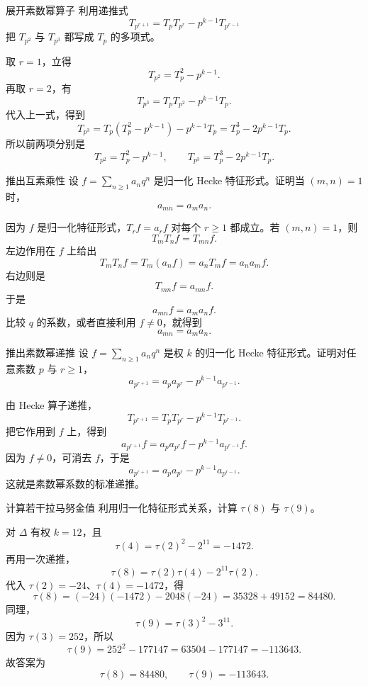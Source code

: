 \begin{problem}{展开素数幂算子}
\medium
利用递推式
\[
T_{p^{r+1}}=T_pT_{p^r}-p^{k-1}T_{p^{r-1}}
\]
把 $T_{p^2}$ 与 $T_{p^3}$ 都写成 $T_p$ 的多项式。
\end{problem}
\begin{solution}
取 $r=1$，立得
\[
T_{p^2}=T_p^2-p^{k-1}.
\]
再取 $r=2$，有
\[
T_{p^3}=T_pT_{p^2}-p^{k-1}T_p.
\]
代入上一式，得到
\[
T_{p^3}=T_p(T_p^2-p^{k-1})-p^{k-1}T_p=T_p^3-2p^{k-1}T_p.
\]
所以前两项分别是
\[
T_{p^2}=T_p^2-p^{k-1},
\qquad
T_{p^3}=T_p^3-2p^{k-1}T_p.
\]
\end{solution}

\begin{problem}{推出互素乘性}
\medium
设 $f=\sum_{n\ge1}a_nq^n$ 是归一化 Hecke 特征形式。证明当 $(m,n)=1$ 时，
\[
a_{mn}=a_ma_n.
\]
\end{problem}
\begin{solution}
因为 $f$ 是归一化特征形式，$T_rf=a_rf$ 对每个 $r\ge1$ 都成立。若 $(m,n)=1$，则
\[
T_mT_nf=T_{mn}f.
\]
左边作用在 $f$ 上给出
\[
T_mT_nf=T_m(a_nf)=a_nT_mf=a_na_mf.
\]
右边则是
\[
T_{mn}f=a_{mn}f.
\]
于是
\[
a_{mn}f=a_ma_nf.
\]
比较 $q$ 的系数，或者直接利用 $f\neq0$，就得到
\[
a_{mn}=a_ma_n.
\]
\end{solution}

\begin{problem}{推出素数幂递推}
\medium
设 $f=\sum_{n\ge1}a_nq^n$ 是权 $k$ 的归一化 Hecke 特征形式。证明对任意素数 $p$ 与 $r\ge1$，
\[
a_{p^{r+1}}=a_pa_{p^r}-p^{k-1}a_{p^{r-1}}.
\]
\end{problem}
\begin{solution}
由 Hecke 算子递推，
\[
T_{p^{r+1}}=T_pT_{p^r}-p^{k-1}T_{p^{r-1}}.
\]
把它作用到 $f$ 上，得到
\[
a_{p^{r+1}}f=a_pa_{p^r}f-p^{k-1}a_{p^{r-1}}f.
\]
因为 $f\neq0$，可消去 $f$，于是
\[
a_{p^{r+1}}=a_pa_{p^r}-p^{k-1}a_{p^{r-1}}.
\]
这就是素数幂系数的标准递推。
\end{solution}

\begin{problem}{计算若干拉马努金值}
\medium
利用归一化特征形式关系，计算 $\tau(8)$ 与 $\tau(9)$。
\end{problem}
\begin{solution}
对 $\Delta$ 有权 $k=12$，且
\[
\tau(4)=\tau(2)^2-2^{11}=-1472.
\]
再用一次递推，
\[
\tau(8)=\tau(2)\tau(4)-2^{11}\tau(2).
\]
代入 $\tau(2)=-24$、$\tau(4)=-1472$，得
\[
\tau(8)=(-24)(-1472)-2048(-24)=35328+49152=84480.
\]
同理，
\[
\tau(9)=\tau(3)^2-3^{11}.
\]
因为 $\tau(3)=252$，所以
\[
\tau(9)=252^2-177147=63504-177147=-113643.
\]
故答案为
\[
\tau(8)=84480,
\qquad
\tau(9)=-113643.
\]
\end{solution}

